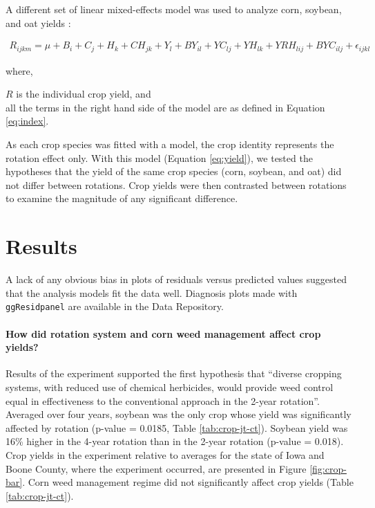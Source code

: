 \documentclass[
]{article}
\begin{document}
A different set of linear mixed-effects model was used to analyze corn, soybean, and oat yields \citep[\texttt{lme4} version 1.1-27.1,][]{batesLme4LinearMixedEffects2021}:

\begin{align}
R_{ijkm} = \mu + B_i + C_j + H_k + CH_{jk} + Y_l + BY_{il} + YC_{lj} + YH_{lk}  + YRH_{lij} + BYC_{ilj} + \epsilon_{ijkl}
\label{eq:yield}
\end{align}

where,

\(R\) is the individual crop yield, and\\
all the terms in the right hand side of the model are as defined in Equation \eqref{eq:index}.

As each crop species was fitted with a model, the crop identity represents the rotation effect only. With this model (Equation \eqref{eq:yield}), we tested the hypotheses that the yield of the same crop species (corn, soybean, and oat) did not differ between rotations. Crop yields were then contrasted between rotations to examine the magnitude of any significant difference.

\hypertarget{results}{%
\section*{Results}\label{results}}

A lack of any obvious bias in plots of residuals versus predicted values suggested that the analysis models fit the data well. Diagnosis plots made with \texttt{ggResidpanel} \citep[version 0.3.0][]{goodeGgResidpanelPanelsInteractive2019} are available in the Data Repository.

\hypertarget{how-did-rotation-system-and-corn-weed-management-affect-crop-yields}{%
\paragraph*{How did rotation system and corn weed management affect crop yields?}\label{how-did-rotation-system-and-corn-weed-management-affect-crop-yields}}

Results of the experiment supported the first hypothesis that ``diverse cropping systems, with reduced use of chemical herbicides, would provide weed control equal in effectiveness to the conventional approach in the 2-year rotation''. Averaged over four years, soybean was the only crop whose yield was significantly affected by rotation (p-value = 0.0185, Table \ref{tab:crop-jt-ct}). Soybean yield was 16\% higher in the 4-year rotation than in the 2-year rotation (p-value = 0.018). Crop yields in the experiment relative to averages for the state of Iowa and Boone County, where the experiment occurred, are presented in Figure \ref{fig:crop-bar}. Corn weed management regime did not significantly affect crop yields (Table \ref{tab:crop-jt-ct}).
\end{document}
